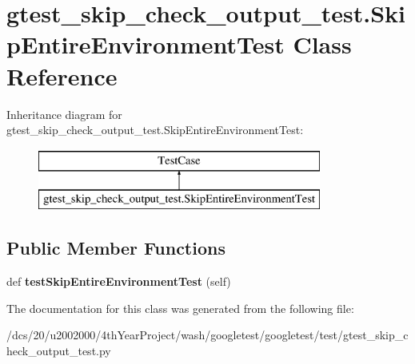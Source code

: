 \hypertarget{classgtest__skip__check__output__test_1_1SkipEntireEnvironmentTest}{}\section{gtest\+\_\+skip\+\_\+check\+\_\+output\+\_\+test.\+Skip\+Entire\+Environment\+Test Class Reference}
\label{classgtest__skip__check__output__test_1_1SkipEntireEnvironmentTest}
Inheritance diagram for gtest\+\_\+skip\+\_\+check\+\_\+output\+\_\+test.\+Skip\+Entire\+Environment\+Test\+:\begin{figure}[H]
\begin{center}
\leavevmode
\includegraphics[height=2.000000cm]{classgtest__skip__check__output__test_1_1SkipEntireEnvironmentTest}
\end{center}
\end{figure}
\subsection*{Public Member Functions}
\begin{DoxyCompactItemize}
\item 
\mbox{\label{classgtest__skip__check__output__test_1_1SkipEntireEnvironmentTest_aeb6899a132e0956298d762701ff45cec}} 
def {\bfseries test\+Skip\+Entire\+Environment\+Test} (self)
\end{DoxyCompactItemize}


The documentation for this class was generated from the following file\+:\begin{DoxyCompactItemize}
\item 
/dcs/20/u2002000/4th\+Year\+Project/wash/googletest/googletest/test/gtest\+\_\+skip\+\_\+check\+\_\+output\+\_\+test.\+py\end{DoxyCompactItemize}

